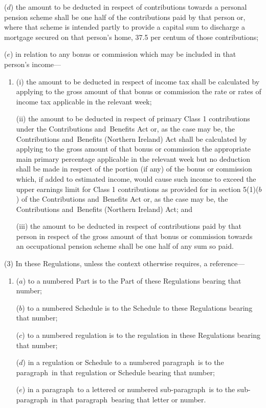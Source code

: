 \documentclass[12pt,a4paper]{article}
\begin{document}
\begin{enumerate}
($d$) the amount to be deducted in respect of contributions towards a personal pension scheme shall be one half of the contributions paid by that person or, where that scheme is intended partly to provide a capital sum to discharge a mortgage secured on that person’s home, 37$.$5 per centum of those contributions;

($e$) in relation to any bonus or commission which may be included in that person’s income—
\begin{enumerate}\item[]
(i) the amount to be deducted in respect of income tax shall be calculated by applying to the gross amount of that bonus or commission the rate or rates of income tax applicable in the relevant week;

(ii) the amount to be deducted in respect of primary Class 1 contributions under the Contributions and~Benefits Act 
or, as the case may be, the Contributions and~Benefits (Northern Ireland) Act  %
shall be calculated by applying to the gross amount of that bonus or commission the appropriate main primary percentage applicable in the relevant week
but no deduction shall be made in respect of the portion (if any) of the bonus or commission which, if added to estimated income, would cause such income to exceed the upper earnings limit for Class 1 contributions as provided for in section 5(1)($b$) of the Contributions and~Benefits Act %
or, as the case may be, the Contributions and~Benefits (Northern Ireland) Act;  %
and

(iii) the amount to be deducted in respect of contributions paid by that person in respect of the gross amount of that bonus or commission towards an occupational pension scheme shall be one half of any sum so paid.
\end{enumerate}
\end{enumerate}

(3) In these Regulations, unless the context otherwise requires, a reference—
\begin{enumerate}\item[]
($a$) to a numbered Part is to the Part of these Regulations bearing that number;

($b$) to a numbered Schedule is to the Schedule to these Regulations bearing that number;

($c$) to a numbered regulation is to the regulation in these Regulations bearing that number;

($d$) in a regulation or Schedule to a numbered paragraph~is to the paragraph~in that regulation or Schedule bearing that number;

($e$) in a paragraph~to a lettered or numbered sub-paragraph~is to the sub-paragraph~in that paragraph~bearing that letter or number.
\end{enumerate}
\end{document}
